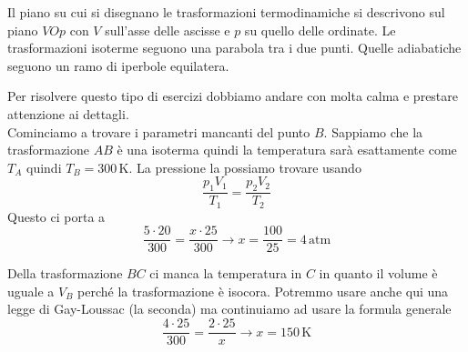 Il piano su cui si disegnano le trasformazioni termodinamiche si descrivono sul piano $VOp$ con $V$
sull'asse delle ascisse e $p$ su quello delle ordinate. Le trasformazioni isoterme seguono una 
parabola tra i due punti. Quelle adiabatiche seguono un ramo di iperbole equilatera.
\begin{center}
\end{center}
Per risolvere questo tipo di esercizi dobbiamo andare con molta calma e prestare attenzione ai 
dettagli.\\
Cominciamo a trovare i parametri mancanti del punto $B$. Sappiamo che la trasformazione $AB$ è una
isoterma quindi la temperatura sarà esattamente come $T_A$ quindi $T_B = 300\,\text{K}$. La pressione
la possiamo trovare usando
\begin{equation*}
\frac{p_1V_1}{T_1} = \frac{p_2V_2}{T_2}
\end{equation*}
Questo ci porta a
\begin{equation*}
\frac{5\cdot20}{300}=\frac{x\cdot25}{300}\rightarrow x = \frac{100}{25}=\boxed{4\,\text{atm}}
\end{equation*}

Della trasformazione $BC$ ci manca la temperatura in $C$ in quanto il volume è uguale a $V_B$ perché
la trasformazione è isocora. Potremmo usare anche qui una legge di Gay-Loussac (la seconda) ma
continuiamo ad usare la formula generale
\begin{equation*}
\frac{4\cdot25}{300}=\frac{2\cdot25}{x}\rightarrow x = \boxed{150\,\text{K}}
\end{equation*}

